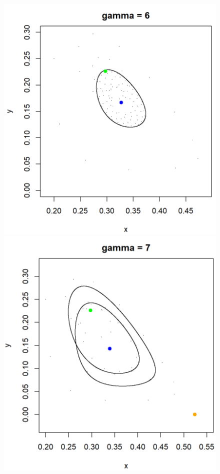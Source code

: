 \documentclass[10pt]{Configuration_Files/PoliMi3i_thesis}
\begin{document}
\begin{figure}[H]
  \includegraphics[width=\linewidth]{images/Chapter 6.1/unnamed-chunk-3-1.png}
\endminipage\hfill
{}
  \includegraphics[width=\linewidth]{images/Chapter 6.1/unnamed-chunk-4-1.png}

\end{figure}
\end{document}
